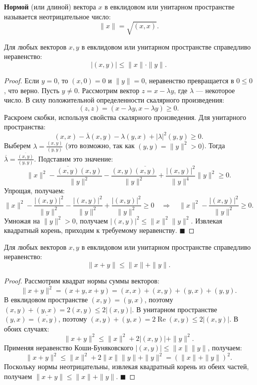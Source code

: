 \begin{definition}
\textbf{Нормой} (или длиной) вектора $x$ в евклидовом или унитарном пространстве называется неотрицательное число:
\[
\|x\| = \sqrt{(x, x)}.
\]
\end{definition}

\begin{theorem}
Для любых векторов $x, y$ в евклидовом или унитарном пространстве справедливо неравенство:
\[
|(x, y)| \le \|x\| \cdot \|y\|.
\]
\end{theorem}

\begin{proof}
Если $y = 0$, то $(x, 0) = 0$ и $\|y\| = 0$, неравенство превращается в $0 \le 0$, что верно.
Пусть $y \neq 0$. Рассмотрим вектор $z = x - \lambda y$, где $\lambda$ --- некоторое число. В силу положительной определенности скалярного произведения:
\[
(z, z) = (x - \lambda y, x - \lambda y) \ge 0.
\]
Раскроем скобки, используя свойства скалярного произведения. Для унитарного пространства:
\[
(x, x) - \overline{\lambda}(x, y) - \lambda(y, x) + |\lambda|^2 (y, y) \ge 0.
\]
Выберем $\lambda = \frac{(x, y)}{(y, y)}$ (это возможно, так как $(y, y) = \|y\|^2 > 0$). Тогда $\overline{\lambda} = \frac{\overline{(x, y)}}{(y, y)}$. Подставим это значение:
\[
\|x\|^2 - \frac{\overline{(x, y)}(x, y)}{\|y\|^2} - \frac{(x, y)\overline{(x, y)}}{\|y\|^2} + \frac{|(x, y)|^2}{\|y\|^4} \|y\|^2 \ge 0.
\]
Упрощая, получаем:
\[
\|x\|^2 - \frac{|(x, y)|^2}{\|y\|^2} - \frac{|(x, y)|^2}{\|y\|^2} + \frac{|(x, y)|^2}{\|y\|^2} \ge 0 \quad \Rightarrow \quad \|x\|^2 - \frac{|(x, y)|^2}{\|y\|^2} \ge 0.
\]
Умножая на $\|y\|^2 > 0$, получаем $|(x, y)|^2 \le \|x\|^2 \|y\|^2$. Извлекая квадратный корень, приходим к требуемому неравенству.
\hfill$\blacksquare$
\end{proof}

\begin{theorem}
Для любых векторов $x, y$ в евклидовом или унитарном пространстве справедливо неравенство:
\[
\|x + y\| \le \|x\| + \|y\|.
\]
\end{theorem}

\begin{proof}
Рассмотрим квадрат нормы суммы векторов:
\[
\|x + y\|^2 = (x + y, x + y) = (x, x) + (x, y) + (y, x) + (y, y).
\]
В евклидовом пространстве $(x, y) = (y, x)$, поэтому $(x, y) + (y, x) = 2(x, y) \le 2|(x, y)|$.
В унитарном пространстве $(y, x) = \overline{(x, y)}$, поэтому $(x, y) + (y, x) = 2 \operatorname{Re}(x, y) \le 2|(x, y)|$.
В обоих случаях:
\[
\|x + y\|^2 \le \|x\|^2 + 2|(x, y)| + \|y\|^2.
\]
Применяя неравенство Коши-Буняковского $|(x, y)| \le \|x\| \|y\|$, получаем:
\[
\|x + y\|^2 \le \|x\|^2 + 2\|x\|\|y\| + \|y\|^2 = (\|x\| + \|y\|)^2.
\]
Поскольку нормы неотрицательны, извлекая квадратный корень из обеих частей, получаем $\|x + y\| \le \|x\| + \|y\|$.
\hfill$\blacksquare$
\end{proof}
